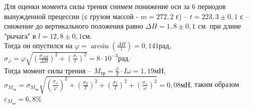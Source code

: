 \documentclass[a4paper,14pt]{extarticle}
\begin{document}
	Для оценки момента силы трения снимем понижение оси за 6 периодов вынужденной прецессии (с грузом массой - $m =  272,2 \text{ г}$) -- $t = 223,3 \pm 0,1 \text{ с}$ -- снижение до вертикального положения равно $\Delta H = 1,8 \pm {0,1} \text{ см.}$ при длине "рычага" в $l = 12,8 \pm {0,1} \text{см}$.\\ 
	Тогда он опустился на $\varphi = \arcsin(\frac{\Delta H}{l})=0,141 \text{рад}$,\\ $\sigma_\varphi=\varphi\sqrt{(\frac{\sigma_{\Delta H}}{\Delta H})^2+(\frac{\sigma_ l}{l})^2}=8\cdot10^{-3}\text{рад}$.\\
	Тогда момент силы трения -- $M_{\text{тр}}=\frac{\varphi}{T}\cdot I\omega = 1,19 \text{мН}$,\\ $\sigma_{M_{\text{тр}}} = \sigma_{M_{\text{тр}}}\sqrt{(\frac{\sigma_\varphi}{\varphi})^2+(\frac{\sigma_T}{T})^2 + (\frac{\sigma_I}{I})^2+(\frac{\sigma_\omega}{\omega})^2} = 0,08\text{мН}$, таким образом  $\varepsilon_{M_{\text{тр}}} = 6,8\%$ 

	
\end{document}
